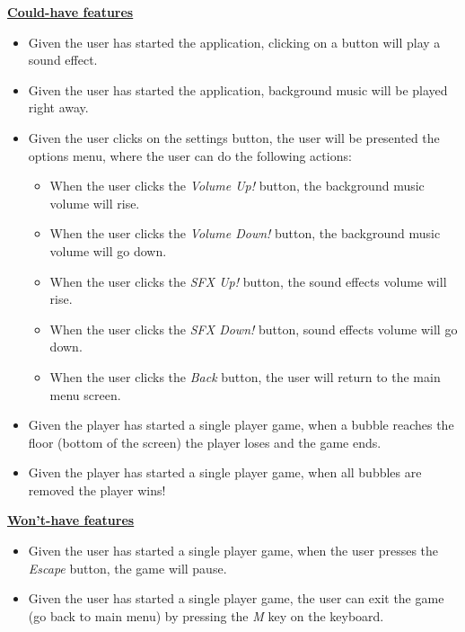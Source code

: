 \documentclass[a4paper,11pt]{article}
\begin{document}
\textbf{\underline{Could-have features}}
\begin{itemize}
  \item Given the user has started the application, clicking on a button will play a sound effect.
  \item Given the user has started the application, background music will be played right away.
  \item Given the user clicks on the settings button, the user will be presented the options menu, where the user can do the following actions:
    \begin{itemize}
    \item When the user clicks the \textit{Volume Up!} button, the background music volume will rise.
    \item When the user clicks the \textit{Volume Down!} button, the background music volume will go down.
    \item When the user clicks the \textit{SFX Up!} button, the sound effects volume will rise.
    \item When the user clicks the \textit{SFX Down!} button, sound effects volume will go down.
    \item When the user clicks the \textit{Back} button, the user will return to the main menu screen.
    \end{itemize}
   \item Given the player has started a single player game, when a bubble reaches the floor (bottom of the screen) the player loses and the game ends.
   \item Given the player has started a single player game, when all bubbles are removed the player wins! \\
\end{itemize}

\textbf{\underline{Won't-have features}}
\begin{itemize}
   \item Given the user has started a single player game, when the user presses the \textit{Escape} button, the game will pause.
   \item Given the user has started a single player game, the user can exit the game (go back to main menu) by pressing the \textit{M} key on the keyboard.
\end{itemize}

\newpage
\end{document}
